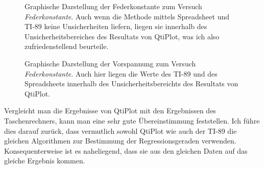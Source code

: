 \vspace*{2em}
\begin{figure}[ht!]
\centering
{}
\caption{
    Graphische    Darstellung     der    Federkonstante     zum    Versuch
    \emph{Federkonstante}. Auch  wenn  die  Methode  mittels  Spreadsheet  und
    TI-89   keine   Unsicherheiten   liefern,   liegen   sie   innerhalb   des
    Unsicherheitsbereiches   des  Resultats   von   QtiPlot,   was  ich   also
    zufriedenstellend beurteile.
}
\label{fig:federkonstante:federkonstante:results}
\end{figure}

\vspace*{2em}
\begin{figure}[ht!]
\centering
{}
\caption{
    Graphische      Darstellung      der     Vorspannung      zum      Versuch
    \emph{Federkonstante}. Auch  hier  liegen  die  Werte des  TI-89  und  des
    Spreadsheets  innerhalb  des   Unsicherheitsbereichts  des  Resultats  von
    QtiPlot.
}
\label{fig:federkonstante:vorspannung:results}
\end{figure}

Vergleicht  man   die  Ergebnisse   von  QtiPlot   mit  den   Ergebnissen  des
Taschenrechners, kann  man eine  sehr gute  \"Ubereinstimmung feststellen. Ich
f\"uhre  dies  darauf  zur\"uck,  dass  vermutlich  sowohl  QtiPlot  wie  auch
der  TI-89  die gleichen  Algorithmen  zur  Bestimmung der  Regressionsgeraden
verwenden. Konsequenterweise  ist es  naheliegend, dass  sie aus  den gleichen
Daten auf das gleiche Ergebnis kommen.

